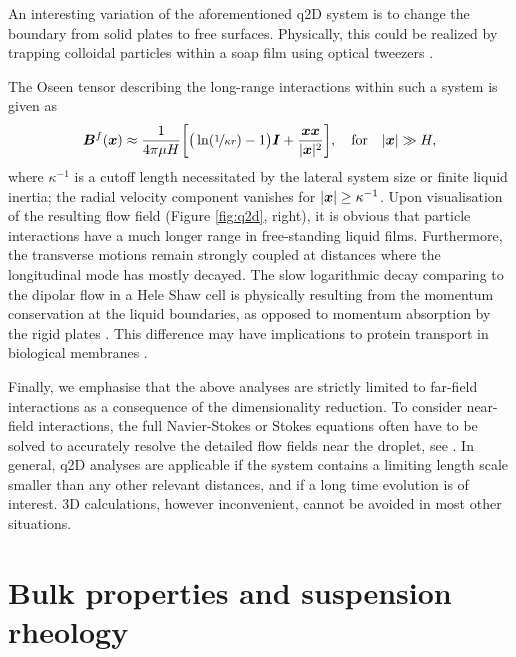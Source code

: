 \medskip
An interesting variation of the aforementioned q2D system is to change the boundary from solid plates to free surfaces. Physically, this could be realized by trapping colloidal particles within a soap film using optical tweezers \citep{Leonardo_etal_2008}.

The Oseen tensor describing the long-range interactions within such a system is given as \citep{Leonardo_etal_2008, Diamant}
\begin{equation}
 \begin{aligned}
   {\bm B}^f({\bm x}) \approx \frac{1}{4\pi\mu H} \bigg[ \big( \ln(\nicefrac{1}{\kappa r}) -1 \big) {\bm I} +\frac{{\bm x}{\bm x} }{ \lvert{\bm x}\rvert^2} \bigg],
   \quad \textrm{for} \quad \lvert\bm x\rvert \gg H,
 \end{aligned}
\end{equation}
where $\kappa^{-1}$ is a cutoff length necessitated by the lateral system size or finite liquid inertia;
\ie the radial velocity component vanishes for $\lvert\bm x\rvert \geq \kappa^{-1}$.%
Upon visualisation of the resulting flow field (Figure \ref{fig:q2d}, right),
it is obvious that particle interactions have a much longer range in free-standing liquid films.
Furthermore, the transverse motions remain strongly coupled at distances where the longitudinal mode has mostly decayed.
The slow logarithmic decay comparing to the dipolar flow in a Hele Shaw cell is physically resulting from the momentum conservation at the liquid boundaries,
as opposed to momentum absorption by the rigid plates \citep{Diamant}.
This difference may have implications to protein transport in biological membranes \citep{Saffman3111}.

\medskip
Finally, we emphasise that the above analyses are strictly limited to far-field interactions as a consequence of the dimensionality reduction.
To consider near-field interactions, the full Navier-Stokes or Stokes equations often have to be solved to accurately resolve the detailed flow fields near the droplet, see \eg \cite{zhu_gallaire_2016, flow-assist}. 
In general, q2D analyses are applicable if the system contains a limiting length scale smaller than any other relevant distances, and if a long time evolution is of interest.
3D calculations, however inconvenient, cannot be avoided in most other situations.


\section{Bulk properties and suspension rheology}
\label{sec:sus-rheo}

